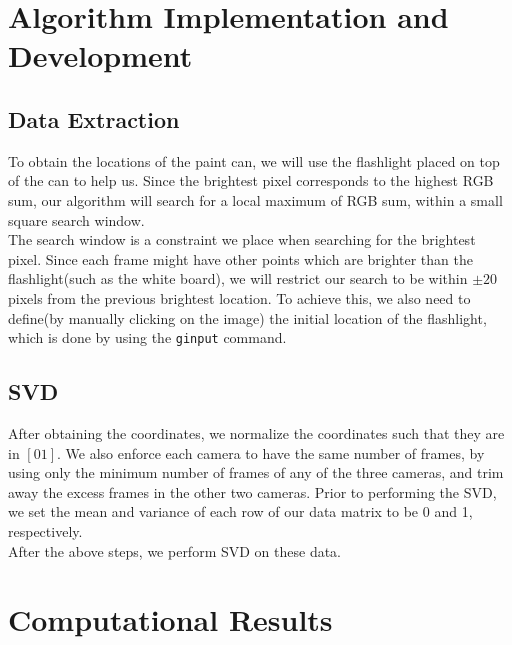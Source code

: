 \documentclass[12pt, a4paper]{article}
\begin{document}
\section{Algorithm Implementation and Development}
\subsection{Data Extraction}
To obtain the locations of the paint can, we will use the flashlight placed on top of the can to help us. Since the brightest pixel corresponds to the highest RGB sum, our algorithm will search for a local maximum of RGB sum, within a small square search window.\\

The search window is a constraint we place when searching for the brightest pixel. Since each frame might have other points which are brighter than the flashlight(such as the white board), we will restrict our search to be within $\pm 20$ pixels from the previous brightest location. To achieve this, we also need to define(by manually clicking on the image) the initial location of the flashlight, which is done by using the \texttt{ginput} command.

\subsection{SVD}
After obtaining the coordinates, we normalize the coordinates such that they are in $[0 1]$. We also enforce each camera to have the same number of frames, by using only the minimum number of frames of any of the three cameras, and trim away the excess frames in the other two cameras. Prior to performing the SVD, we set the mean and variance of each row of our data matrix to be 0 and 1, respectively.\\

After the above steps, we perform SVD on these data.
\section{Computational Results}
\end{document}
